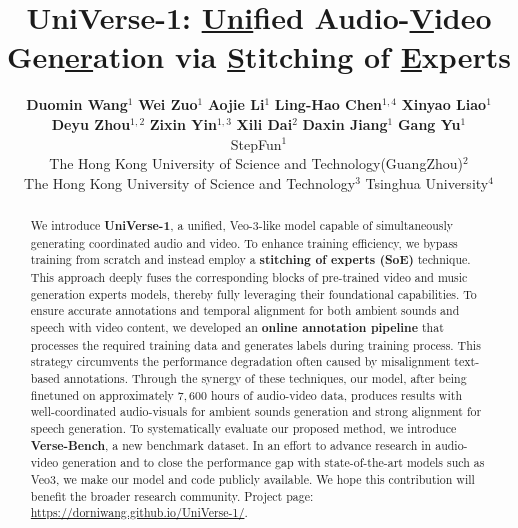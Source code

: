 \documentclass{article}
\title{UniVerse-1: \underline{Uni}fied Audio-\underline{V}ideo Gen\underline{er}ation via \underline{S}titching of \underline{E}xperts}
\author{
    \textbf{Duomin Wang}$^{1}$ \quad 
    \textbf{Wei Zuo}$^{1}$ \quad 
    \textbf{Aojie Li}$^{1}$ \quad 
    \textbf{Ling-Hao Chen}$^{1,4}$ \quad
    \textbf{Xinyao Liao}$^{1}$ \quad  \\
    \textbf{Deyu Zhou}$^{1,2}$ \quad 
    \textbf{Zixin Yin}$^{1,3}$ \quad 
    \textbf{Xili Dai}$^{2}$ \quad 
    \textbf{Daxin Jiang}$^{1}$ \quad 
    \textbf{Gang Yu}$^{1}$ \quad 
    \\
    StepFun$^{1}$ \quad \\
    The Hong Kong University of Science and Technology(GuangZhou)$^{2}$ \quad \\
    The Hong Kong University of Science and Technology$^{3}$ Tsinghua University$^{4}$\quad \\
}
\begin{document}
\maketitle


\begin{abstract}
We introduce \textbf{UniVerse-1}, a unified, Veo-3-like model capable of simultaneously generating coordinated audio and video. To enhance training efficiency, we bypass training from scratch and instead employ a \textbf{stitching of experts (SoE)} technique. This approach deeply fuses the corresponding blocks of pre-trained video and music generation experts models, thereby fully leveraging their foundational capabilities. To ensure accurate annotations and temporal alignment for both ambient sounds and speech with video content, we developed an \textbf{online annotation pipeline} that processes the required training data and generates labels during training process. This strategy circumvents the performance degradation often caused by misalignment text-based annotations. Through the synergy of these techniques, our model, after being finetuned on approximately $7,600$ hours of audio-video data, produces results with well-coordinated audio-visuals for ambient sounds generation and strong alignment for speech generation. To systematically evaluate our proposed method, we introduce \textbf{Verse-Bench}, a new benchmark dataset. In an effort to advance research in audio-video generation and to close the performance gap with state-of-the-art models such as Veo3, we make our model and code publicly available. We hope this contribution will benefit the broader research community. Project page: \url{https://dorniwang.github.io/UniVerse-1/}.
\end{abstract}








\newpage

{
    \small
    
    
}

\newpage

\end{document}
